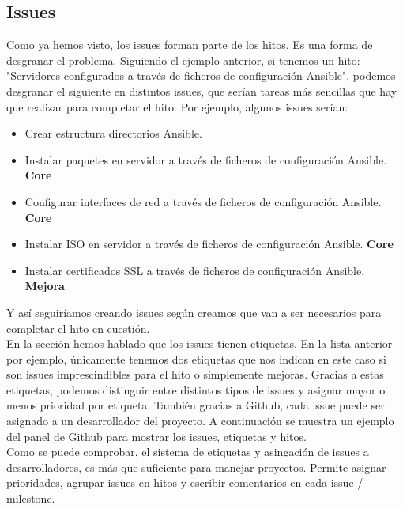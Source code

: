 \subsection{Issues}
\begin{text}
	Como ya hemos visto, los issues forman parte de los hitos. Es una forma de desgranar el problema. Siguiendo el ejemplo anterior, si tenemos un hito: "Servidores configurados a través de ficheros de configuración Ansible", podemos desgranar el siguiente en distintos issues, que serían tareas más sencillas que hay que realizar para completar el hito. Por ejemplo, algunos issues serían: 
	\begin{itemize}
		\item Crear estructura directorios Ansible.
		\item Instalar paquetes en servidor a través de ficheros de configuración Ansible. \textbf{Core}
		\item Configurar interfaces de red a través de ficheros de configuración Ansible. \textbf{Core}
		\item Instalar ISO en servidor a través de ficheros de configuración Ansible. \textbf{Core}
		\item Instalar certificados SSL a través de ficheros de configuración Ansible. \textbf{Mejora}
	\end{itemize}
	
	Y así seguiríamos creando issues según creamos que van a ser necesarios para completar el hito en cuestión. \\
	En la sección   hemos hablado que los issues tienen etiquetas. En la lista anterior por ejemplo, únicamente tenemos dos etiquetas que nos indican en este caso si son issues imprescindibles para el hito o simplemente mejoras. Gracias a estas etiquetas, podemos distinguir entre distintos tipos de issues y asignar mayor o menos prioridad por etiqueta. También gracias a Github, cada issue puede ser asignado a un desarrollador del proyecto. A continuación se muestra un ejemplo del panel de Github para mostrar los issues, etiquetas y hitos. \\
	Como se puede comprobar, el sistema de etiquetas y asingación de issues a desarrolladores, es más que suficiente para manejar proyectos. Permite asignar prioridades, agrupar issues en hitos y escribir comentarios en cada issue / milestone. 
	

\end{text}
